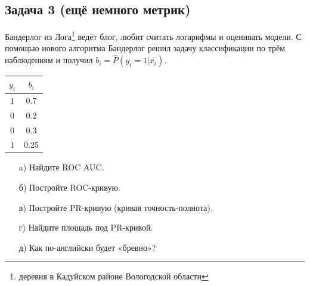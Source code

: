 \documentclass[12pt, a4paper, oneside]{article}
\begin{document}
\subsection*{Задача 3 (ещё немного метрик)}

Бандерлог из Лога\footnote{деревня в Кадуйском районе Вологодской области} ведёт блог, любит считать логарифмы и оценивать модели. С помощью нового алгоритма Бандерлог решил задачу классификации по трём наблюдениям и получил $b_i = \hat P(y_i = 1|x_i)$.

\begin{center}
	\begin{tabular}{c|c}
		$y_i$ & $b_i$ \\
		\hline
		$1$  & $0.7$ \\
		$0$ & $0.2$ \\
		$0$ & $0.3$ \\
		$1$ & $0.25$ \\
	\end{tabular}
\end{center}

\begin{enumerate}
	\item[a)] Найдите ROC AUC.
	\item[б)] Постройте ROC-кривую.
	\item[в)] Постройте PR-кривую (кривая точность-полнота).
	\item[г)] Найдите площадь под PR-кривой.
	\item[д)] Как по-английски будет «бревно»?
\end{enumerate}
\end{document}
